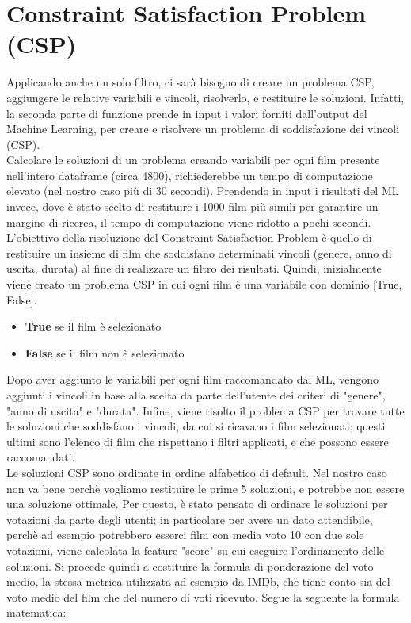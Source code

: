 \documentclass{report}
\begin{document}
    \section{Constraint Satisfaction Problem (CSP)}
        Applicando anche un solo filtro, ci sarà bisogno di creare un problema CSP, aggiungere le relative variabili e vincoli, risolverlo, e restituire le soluzioni.
        Infatti, la seconda parte di funzione prende in input i valori forniti dall'output del Machine Learning, per creare e risolvere un problema di soddisfazione dei vincoli (CSP). \\Calcolare le soluzioni di un problema creando variabili per ogni film presente nell'intero dataframe (circa 4800), richiederebbe un tempo di computazione elevato (nel nostro caso più di 30 secondi). Prendendo in input i risultati del ML invece, dove è stato scelto di restituire i 1000 film più simili per garantire un margine di ricerca, il tempo di computazione viene ridotto a pochi secondi. L'obiettivo della risoluzione del Constraint Satisfaction Problem è quello di restituire un insieme di film che soddisfano determinati vincoli (genere, anno di uscita, durata) al fine di realizzare un filtro dei risultati.
        Quindi, inizialmente viene creato un problema CSP in cui ogni film è una variabile con dominio [True, False]. 
        \begin{itemize}
            \item \textbf{True} se il film è selezionato
            \item \textbf{False} se il film non è selezionato
        \end{itemize}
        Dopo aver aggiunto le variabili per ogni film raccomandato dal ML, vengono aggiunti i vincoli in base alla scelta da parte dell'utente dei criteri di "genere", "anno di uscita" e "durata".
        Infine, viene risolto il problema CSP per trovare tutte le soluzioni che soddisfano i vincoli, da cui si ricavano i film selezionati; questi ultimi sono l'elenco di film che rispettano i filtri applicati, e che possono essere raccomandati. \\
        Le soluzioni CSP sono ordinate in ordine alfabetico di default. Nel nostro caso non va bene perchè vogliamo restituire le prime 5 soluzioni, e potrebbe non essere una soluzione ottimale. Per questo, è stato pensato di ordinare le soluzioni per votazioni da parte degli utenti; in particolare per avere un dato attendibile, perchè ad esempio potrebbero esserci film con media voto 10 con due sole votazioni, viene calcolata la feature "score" su cui eseguire l'ordinamento delle soluzioni. Si procede quindi a costituire la formula di ponderazione del voto medio, la stessa metrica utilizzata ad esempio da IMDb, che tiene conto sia del voto medio del film che del numero di voti ricevuto. Segue la seguente la formula matematica:
\end{document}

